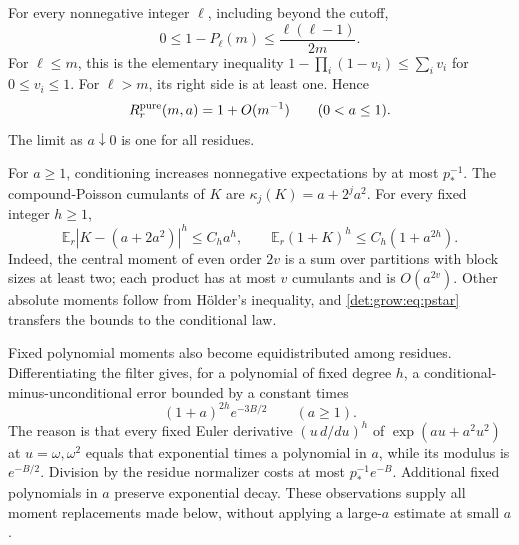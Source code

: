 \documentclass[11pt,letterpaper]{article}
\numberwithin{equation}{section}
\theoremstyle{definition}\newtheorem{definition}[theorem]{Definition}
\theoremstyle{remark}\newtheorem{remark}[theorem]{Remark}
\newcommand{\E}{\mathbb E}
\begin{document}
For every nonnegative integer $\ell$, including beyond the cutoff,
\begin{equation}\label{det:grow:eq:Pfirst}
 0\le1-P_\ell(m)\le\frac{\ell(\ell-1)}{2m}.
\end{equation}
For $\ell\le m$, this is the elementary inequality
$1-\prod_i(1-v_i)\le\sum_i v_i$ for $0\le v_i\le1$.
For $\ell>m$, its right side is at least one. Hence
\begin{equation}\label{det:grow:eq:pure-small}
 R_r^{\rm pure}(m,a)=1+O(m^{-1})\qquad(0<a\le1).
\end{equation}
The limit as $a\downarrow0$ is one for all residues.

For $a\ge1$, conditioning increases nonnegative expectations by at most
$p_*^{-1}$. The compound-Poisson cumulants of $K$ are
$\kappa_j(K)=a+2^j a^2$. For every fixed integer $h\ge1$,
\begin{equation}\label{det:grow:eq:moments}
 \E_r|K-(a+2a^2)|^h\le C_h a^h,\qquad
 \E_r(1+K)^h\le C_h(1+a^{2h}).
\end{equation}
Indeed, the central moment of even order $2v$ is a sum over partitions
with block sizes at least two; each product has at most $v$ cumulants
and is $O(a^{2v})$. Other absolute moments follow from H\"older's
inequality, and \eqref{det:grow:eq:pstar} transfers the bounds to the conditional
law.

Fixed polynomial moments also become equidistributed among residues.
Differentiating the filter gives, for a polynomial of fixed degree $h$,
a conditional-minus-unconditional error bounded by a constant times
\begin{equation}\label{det:grow:eq:filtererror}
 (1+a)^{2h}e^{-3B/2}\qquad(a\ge1).
\end{equation}
The reason is that every fixed Euler derivative $(u\,d/du)^h$ of
$\exp(au+a^2u^2)$ at $u=\omega,\omega^2$ equals that exponential times
a polynomial in $a$, while its modulus is $e^{-B/2}$. Division by the
residue normalizer costs at most $p_*^{-1}e^{-B}$. Additional fixed
polynomials in $a$ preserve exponential decay. These observations
supply all moment replacements made below, without applying a
large-$a$ estimate at small $a$.
\end{document}
